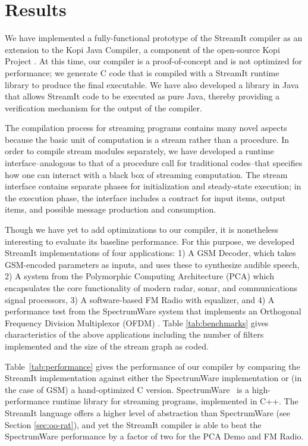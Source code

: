 \section{Results}
\label{sec:results}

We have implemented a fully-functional prototype of the StreamIt
compiler as an extension to the Kopi Java Compiler, a component of the
open-source Kopi Project \cite{kopi}.  At this time, our compiler is a
proof-of-concept and is not optimized for performance; we generate C
code that is compiled with a StreamIt runtime library to produce the
final executable.  We have also developed a library in Java that
allows StreamIt code to be executed as pure Java, thereby providing a
verification mechanism for the output of the compiler.

The compilation process for streaming programs contains many novel
aspects because the basic unit of computation is a stream rather than
a procedure.  In order to compile stream modules separately, we have
developed a runtime interface--analogous to that of a procedure call
for traditional codes--that specifies how one can interact with a
black box of streaming computation.  The stream interface contains
separate phases for initialization and steady-state execution; in the
execution phase, the interface includes a contract for input items,
output items, and possible message production and consumption.

Though we have yet to add optimizations to our compiler, it is
nonetheless interesting to evaluate its baseline performance.  For
this purpose, we developed StreamIt implementations of four
applications: 1) A GSM Decoder, which takes GSM-encoded parameters as
inputs, and uses these to synthesize audible speech, 2) A system from
the Polymorphic Computing Architecture (PCA) \cite{pca} which
encapsulates the core functionality of modern radar, sonar, and
communications signal processors, 3) A software-based FM Radio with
equalizer, and 4) A performance test from the SpectrumWare system that
implements an Orthogonal Frequency Division Multiplexor (OFDM)
\cite{spectrumware}.  Table \ref{tab:benchmarks} gives characteristics
of the above applications including the number of filters implemented
and the size of the stream graph as coded.

Table~\ref{tab:performance} gives the performance of our compiler by
comparing the StreamIt implementation against either the SpectrumWare
implementation or (in the case of GSM) a hand-optimized C version.
SpectrumWare \cite{spectrumware}~is a high-performance runtime library
for streaming programs, implemented in C++.  The StreamIt language
offers a higher level of abstraction than SpectrumWare (see Section
\ref{sec:oo-rat}), and yet the StreamIt compiler is able to beat the
SpectrumWare performance by a factor of two for the PCA Demo and FM
Radio.

